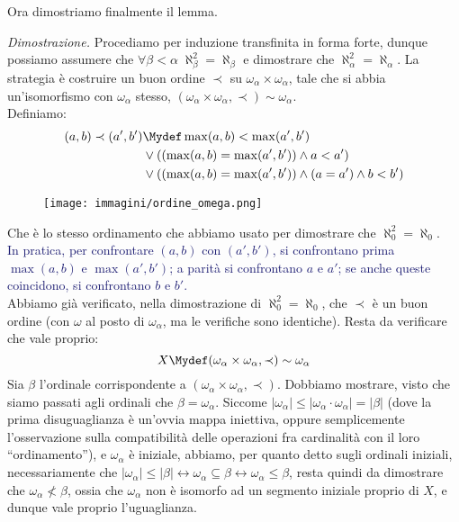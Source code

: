 \documentclass[11pt]{scrartcl}
\begin{document}
Ora dimostriamo finalmente il lemma.

\hspace{-0.41cm}\emph{Dimostrazione.}\quad
	Procediamo per induzione transfinita in forma forte, dunque possiamo assumere che $\forall \beta < \alpha \; \aleph_\beta^2 = \aleph_\beta$ e dimostrare che $\aleph_\alpha^2 = \aleph_\alpha$. La strategia è costruire un buon ordine $\prec$ su $\omega_\alpha \times \omega_\alpha$,
	tale che si abbia un'isomorfismo con $\omega_\alpha$ stesso, $(\omega_\alpha \times \omega_\alpha, \prec) \sim \omega_\alpha$.\\
	Definiamo:
	\begin{align*}
		(a,b) \prec (a',b') &\Mydef \max(a,b) < \max(a',b') \\
							&\lor ((\max(a,b) = \max(a',b')) \land a < a') \\
							&\lor ((\max(a,b) = \max(a',b')) \land (a = a') \land b < b')
	\end{align*}
	\begin{wrapfigure}[9]{l}{2.5cm}
		\texttt{[image: immagini/ordine\_omega.png]}
	\end{wrapfigure}
	Che è lo stesso ordinamento che abbiamo usato per dimostrare che $\aleph_0^2 = \aleph_0$.\\
	\textcolor{MidnightBlue}{In pratica, per confrontare $(a,b)$ con $(a',b')$, si confrontano prima $\max(a,b)$ e $\max(a',b')$;
	a parità si confrontano $a$ e $a'$; se anche queste coincidono, si confrontano $b$ e $b'$.}\\
	Abbiamo già verificato, nella dimostrazione di $\aleph_0^2 = \aleph_0$, che $\prec$ è un buon ordine (con $\omega$ al posto di $\omega_\alpha$, ma le verifiche sono identiche).
	Resta da verificare che vale proprio:
	\[ X \Mydef (\omega_\alpha \times \omega_\alpha, \prec) \sim \omega_\alpha
		\]
	Sia $\beta$ l'ordinale corrispondente a $(\omega_\alpha \times \omega_\alpha, \prec)$. Dobbiamo mostrare, visto che siamo passati agli ordinali che $\beta = \omega_\alpha$. Siccome $|\omega_\alpha| \leq |\omega_\alpha \cdot \omega_\alpha| = |\beta|$ (dove la prima disuguaglianza è
	un'ovvia mappa iniettiva, oppure semplicemente l'osservazione sulla compatibilità delle operazioni fra cardinalità con il loro ``ordinamento''), e $\omega_\alpha$ è iniziale, abbiamo, per quanto detto sugli ordinali iniziali, necessariamente che $|\omega_\alpha| \leq |\beta| \leftrightarrow \omega_\alpha \subseteq \beta \leftrightarrow \omega_\alpha \leq \beta$, resta quindi da dimostrare che 
	$\omega_\alpha \not < \beta$, ossia che $\omega_\alpha$ non è isomorfo ad un segmento iniziale proprio di $X$, e dunque vale proprio l'uguaglianza.\\
\end{document}
